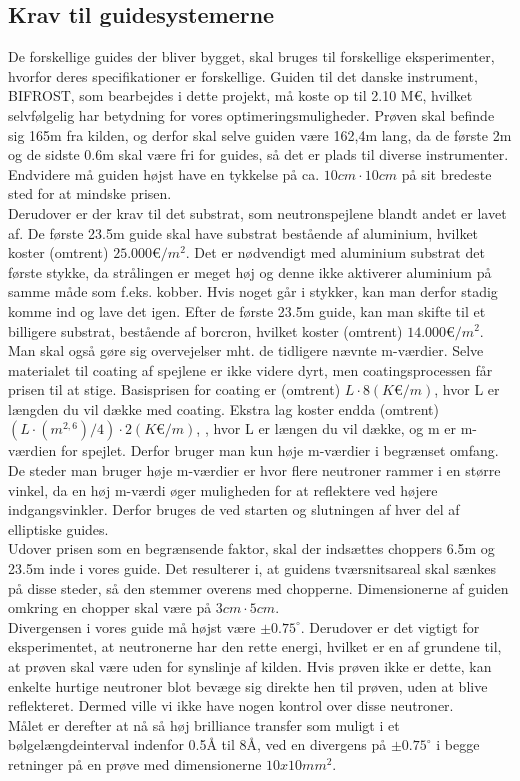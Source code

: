 \documentclass[12pt,oneside,a4paper]{article}
\begin{document}
{{{{{\subsection{Krav til guidesystemerne}
De forskellige guides der bliver bygget, skal bruges til forskellige eksperimenter, hvorfor deres specifikationer er forskellige. Guiden til det danske instrument, BIFROST, som bearbejdes i dette projekt, må koste op til 2.10 M€, hvilket selvfølgelig har betydning for vores optimeringsmuligheder. Prøven skal befinde sig 165m fra kilden, og derfor skal selve guiden være 162,4m lang, da de første 2m og de sidste 0.6m skal være fri for guides, så det er plads til diverse instrumenter. Endvidere må guiden højst have en tykkelse på ca. $10cm \cdot 10cm$ på sit bredeste sted for at mindske prisen.
\\
Derudover er der krav til det substrat, som neutronspejlene blandt andet er lavet af. De første 23.5m guide skal have substrat bestående af aluminium, hvilket koster (omtrent) $25.000 \text{€}/m^2$. Det er nødvendigt med aluminium substrat det første stykke, da strålingen er meget høj og denne ikke aktiverer aluminium på samme måde som f.eks. kobber. Hvis noget går i stykker, kan man derfor stadig komme ind og lave det igen. Efter de første 23.5m guide, kan man skifte til et billigere substrat, bestående af borcron, hvilket koster (omtrent) $14.000 \text{€}/m^2$.
\\
Man skal også gøre sig overvejelser mht. de tidligere nævnte m-værdier. Selve materialet til coating af spejlene er ikke videre dyrt, men coatingsprocessen får prisen til at stige. Basisprisen for coating er (omtrent) $L\cdot8(K\text{€}/m)$, hvor L er længden du vil dække med coating. Ekstra lag koster endda (omtrent) $(L\cdot(m^{2,6})/4)\cdot2(K\text{€}/m)$, , hvor L er længen du vil dække, og m er m-værdien for spejlet. Derfor bruger man kun høje m-værdier i begrænset omfang. De steder man bruger høje m-værdier er hvor flere neutroner rammer i en større vinkel, da en høj m-værdi øger muligheden for at reflektere ved højere indgangsvinkler. Derfor bruges de ved starten og slutningen af hver del af elliptiske guides.
\\
Udover prisen som en begrænsende faktor, skal der indsættes choppers 6.5m og 23.5m inde i vores guide. Det resulterer i, at guidens tværsnitsareal skal sænkes på disse steder, så den stemmer overens med chopperne. Dimensionerne af guiden omkring en chopper skal være på $3cm\cdot5cm$. 
\\
Divergensen i vores guide må højst være $\pm0.75^\circ$. Derudover er det vigtigt for eksperimentet, at neutronerne har den rette energi, hvilket er en af grundene til, at prøven skal være uden for synslinje af kilden. Hvis prøven ikke er dette, kan enkelte hurtige neutroner blot  bevæge sig direkte hen til prøven, uden at blive reflekteret. Dermed ville vi ikke have nogen kontrol over disse neutroner.
\\
Målet er derefter at nå så høj brilliance transfer som muligt i et bølgelængdeinterval indenfor 0.5Å til 8Å, ved en divergens på $\pm0.75^\circ$ i begge retninger på en prøve med dimensionerne $10x10 mm^2$.

}}}}}
\end{document}
